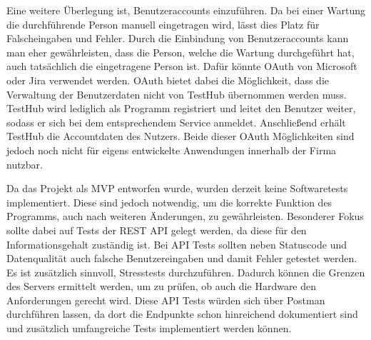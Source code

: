 Eine weitere Überlegung ist, Benutzeraccounts einzuführen. Da bei einer Wartung
die durchführende Person manuell eingetragen wird, lässt dies Platz für Falscheingaben und Fehler. 
Durch die Einbindung von Benutzeraccounts kann man eher gewährleisten, dass die 
Person, welche die Wartung durchgeführt hat, auch tatsächlich die eingetragene Person ist. Dafür könnte OAuth
von Microsoft oder \gls{Jira} verwendet werden. OAuth bietet dabei die Möglichkeit, dass
die Verwaltung der Benutzerdaten nicht von TestHub übernommen werden muss. TestHub
wird lediglich als Programm registriert und leitet den Benutzer weiter, sodass er sich
bei dem entsprechendem Service anmeldet. Anschließend erhält TestHub die Accountdaten
des Nutzers. Beide dieser OAuth Möglichkeiten sind jedoch noch nicht für eigens entwickelte 
Anwendungen innerhalb der Firma nutzbar.

Da das Projekt als \gls{MVP} entworfen wurde, wurden derzeit keine Softwaretests
implementiert. Diese sind jedoch notwendig, um die korrekte Funktion des
Programms, auch nach weiteren Änderungen, zu gewährleisten. Besonderer Fokus sollte dabei
auf Tests der \gls{REST} \gls{API} gelegt werden, da diese für den Informationsgehalt 
zuständig ist. Bei \gls{API} Tests sollten neben Statuscode und Datenqualität auch 
falsche Benutzereingaben und damit Fehler getestet werden. Es ist zusätzlich sinnvoll,
Stresstests durchzuführen. Dadurch können die Grenzen des Servers ermittelt werden,
um zu prüfen, ob auch die Hardware den Anforderungen gerecht wird. Diese \gls{API}
Tests würden sich über Postman durchführen lassen,
da dort die Endpunkte schon hinreichend dokumentiert sind und zusätzlich umfangreiche Tests
implementiert werden können.